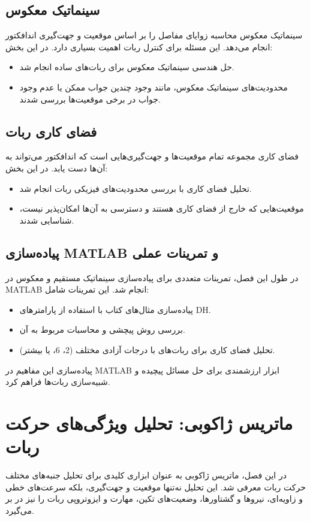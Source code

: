\subsection*{سینماتیک معکوس}
سینماتیک معکوس محاسبه زوایای مفاصل را بر اساس موقعیت و جهت‌گیری اندافکتور انجام می‌دهد. این مسئله برای کنترل ربات اهمیت بسیاری دارد. در این بخش:
\begin{itemize}
	\item حل هندسی سینماتیک معکوس برای ربات‌های ساده انجام شد.
	\item محدودیت‌های سینماتیک معکوس، مانند وجود چندین جواب ممکن یا عدم وجود جواب در برخی موقعیت‌ها بررسی شدند.
\end{itemize}

\subsection*{فضای کاری ربات}
فضای کاری مجموعه تمام موقعیت‌ها و جهت‌گیری‌هایی است که اندافکتور می‌تواند به آن‌ها دست یابد. در این بخش:
\begin{itemize}
	\item تحلیل فضای کاری با بررسی محدودیت‌های فیزیکی ربات انجام شد.
	\item موقعیت‌هایی که خارج از فضای کاری هستند و دسترسی به آن‌ها امکان‌پذیر نیست، شناسایی شدند.
\end{itemize}

\subsection*{پیاده‌سازی MATLAB و تمرینات عملی}
در طول این فصل، تمرینات متعددی برای پیاده‌سازی سینماتیک مستقیم و معکوس در MATLAB انجام شد. این تمرینات شامل:
\begin{itemize}
	\item پیاده‌سازی مثال‌های کتاب با استفاده از پارامترهای DH.
	\item بررسی روش پیچشی و محاسبات مربوط به آن.
	\item تحلیل فضای کاری برای ربات‌های با درجات آزادی مختلف (2، 6، یا بیشتر).
\end{itemize}
پیاده‌سازی این مفاهیم در MATLAB ابزار ارزشمندی برای حل مسائل پیچیده و شبیه‌سازی ربات‌ها فراهم کرد.

\section*{ماتریس ژاکوبی: تحلیل ویژگی‌های حرکت ربات}
در این فصل، ماتریس ژاکوبی به عنوان ابزاری کلیدی برای تحلیل جنبه‌های مختلف حرکت ربات معرفی شد. این تحلیل نه‌تنها موقعیت و جهت‌گیری، بلکه سرعت‌های خطی و زاویه‌ای، نیروها و گشتاورها، وضعیت‌های تکین، مهارت و ایزوتروپی ربات را نیز در بر می‌گیرد.

